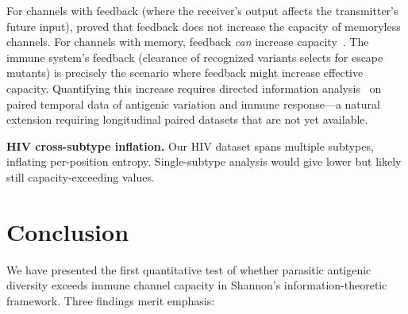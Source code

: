 \documentclass[twocolumn,10pt]{article}
\begin{document}
For channels with feedback (where the receiver's output affects the transmitter's future input), \citet{shannon1956} proved that feedback does not increase the capacity of memoryless channels.  For channels with memory, feedback \emph{can} increase capacity~\citep{coverpombra1989}.  The immune system's feedback (clearance of recognized variants selects for escape mutants) is precisely the scenario where feedback might increase effective capacity.  Quantifying this increase requires directed information analysis~\citep{massey1990} on paired temporal data of antigenic variation and immune response---a natural extension requiring longitudinal paired datasets that are not yet available.

\textbf{HIV cross-subtype inflation.}  Our HIV dataset spans multiple subtypes, inflating per-position entropy.  Single-subtype analysis would give lower but likely still capacity-exceeding values.

\section{Conclusion}
\label{sec:conclusion}

We have presented the first quantitative test of whether parasitic antigenic diversity exceeds immune channel capacity in Shannon's information-theoretic framework.  Three findings merit emphasis:
\end{document}
